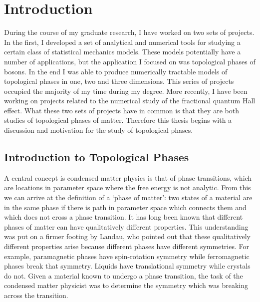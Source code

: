 \chapter{Introduction}

During the course of my graduate research, I have worked on two sets of projects. In the first, I developed a set of analytical and numerical tools for studying a certain class of statistical mechanics models. These models potentially have a number of applications, but the application I focused on was topological phases of bosons. In the end I was able to produce numerically tractable models of topological phases in one, two and three dimensions. This series of projects occupied the majority of my time during my degree. 
More recently, I have been working on projects related to the numerical study of the fractional quantum Hall effect. What these two sets of projects have in common is that they are both studies of topological phases of matter. Therefore this thesis begins with a discussion and motivation for the study of topological phases.

\section{Introduction to Topological Phases}

A central concept is condensed matter physics is that of phase transitions, which are locations in parameter space where the free energy is not analytic. From this we can arrive at the definition of a `phase of matter': two states of a material are in the same phase if there is path in parameter space which connects them and which does not cross a phase transition. It has long been known that different phases of matter can have qualitatively different properties. This understanding was put on a firmer footing by Landau\cite{Wen_book}, who pointed out that these qualitatively different properties arise because different phases have different symmetries.  For example, paramagnetic phases have spin-rotation symmetry while ferromagnetic phases break that symmetry. Liquids have translational symmetry while crystals do not. Given a material known to undergo a phase transition, the task of the condensed matter physicist was to determine the symmetry which was breaking across the transition.



